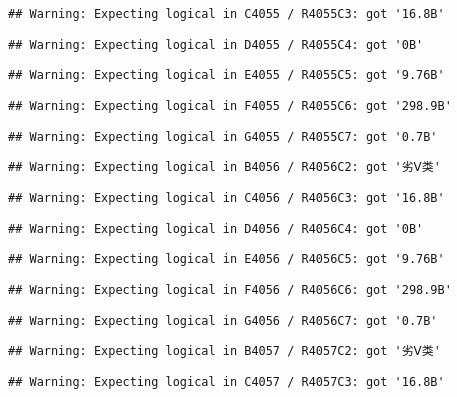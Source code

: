\documentclass[
]{article}
\begin{document}
\begin{verbatim}
## Warning: Expecting logical in C4055 / R4055C3: got '16.8B'
\end{verbatim}

\begin{verbatim}
## Warning: Expecting logical in D4055 / R4055C4: got '0B'
\end{verbatim}

\begin{verbatim}
## Warning: Expecting logical in E4055 / R4055C5: got '9.76B'
\end{verbatim}

\begin{verbatim}
## Warning: Expecting logical in F4055 / R4055C6: got '298.9B'
\end{verbatim}

\begin{verbatim}
## Warning: Expecting logical in G4055 / R4055C7: got '0.7B'
\end{verbatim}

\begin{verbatim}
## Warning: Expecting logical in B4056 / R4056C2: got '劣Ⅴ类'
\end{verbatim}

\begin{verbatim}
## Warning: Expecting logical in C4056 / R4056C3: got '16.8B'
\end{verbatim}

\begin{verbatim}
## Warning: Expecting logical in D4056 / R4056C4: got '0B'
\end{verbatim}

\begin{verbatim}
## Warning: Expecting logical in E4056 / R4056C5: got '9.76B'
\end{verbatim}

\begin{verbatim}
## Warning: Expecting logical in F4056 / R4056C6: got '298.9B'
\end{verbatim}

\begin{verbatim}
## Warning: Expecting logical in G4056 / R4056C7: got '0.7B'
\end{verbatim}

\begin{verbatim}
## Warning: Expecting logical in B4057 / R4057C2: got '劣Ⅴ类'
\end{verbatim}

\begin{verbatim}
## Warning: Expecting logical in C4057 / R4057C3: got '16.8B'
\end{verbatim}
\end{document}
